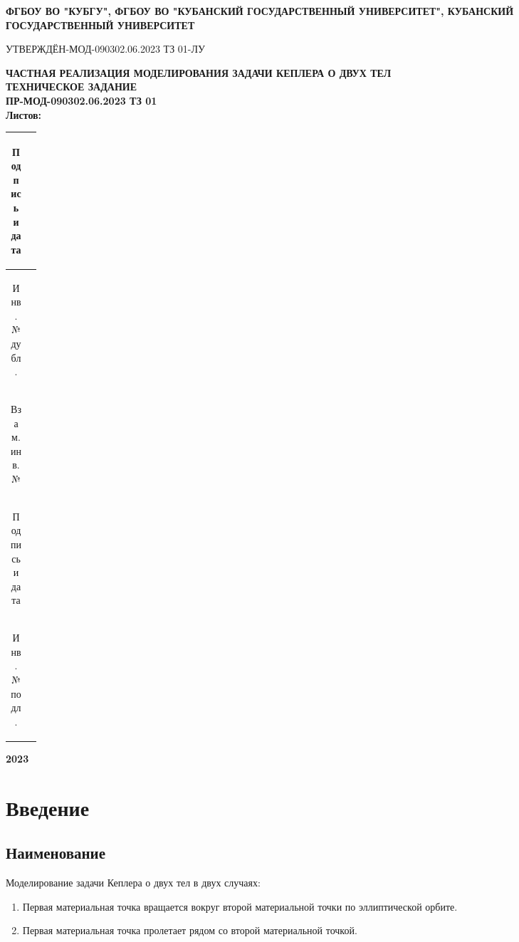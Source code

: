 


 \thispagestyle{empty}
 \begin{center}
 \large{\textbf{ФГБОУ ВО "КУБГУ", ФГБОУ ВО "КУБАНСКИЙ ГОСУДАРСТВЕННЫЙ УНИВЕРСИТЕТ", КУБАНСКИЙ ГОСУДАРСТВЕННЫЙ УНИВЕРСИТЕТ}}\\[3ex]
 \end{center}
 УТВЕРЖДЁН-МОД-090302.06.2023 ТЗ 01-ЛУ\newline
 \begin{center}
  \large{\textbf{ЧАСТНАЯ РЕАЛИЗАЦИЯ МОДЕЛИРОВАНИЯ ЗАДАЧИ КЕПЛЕРА О ДВУХ ТЕЛ}}
  \\[3ex]
  \large{\textbf{ТЕХНИЧЕСКОЕ ЗАДАНИЕ\\ПР-МОД-090302.06.2023 ТЗ 01\\Листов: \pageref{lastpage}}}
 \end{center}
 \begin{table}[!h]
  \begin{tabular}{|c|p{0.05\linewidth}|} \hline
   \begin{sideways}Подпись и дата\end{sideways} & \\ \hline
   \begin{sideways}Инв.№ дубл.\end{sideways} & \\ \hline
   \begin{sideways}Взам.инв.№\end{sideways} & \\ \hline
   \begin{sideways}Подпись и дата\end{sideways} & \\ \hline
   \begin{sideways}Инв.№подл.\end{sideways} & \\ \hline
  \end{tabular}
 \end{table}
 \hfill \break
 \begin{center}
  \large{\textbf{2023}}
 \end{center}

 \newpage
 \tableofcontents\newpage
 \section{Введение}
 \subsection{Наименование}
 Моделирование задачи Кеплера о двух тел в двух случаях:
 \begin{enumerate}
  \item Первая материальная точка вращается вокруг второй материальной точки по эллиптической орбите.
  \item Первая материальная точка пролетает рядом со второй материальной точкой.
 \end{enumerate}
